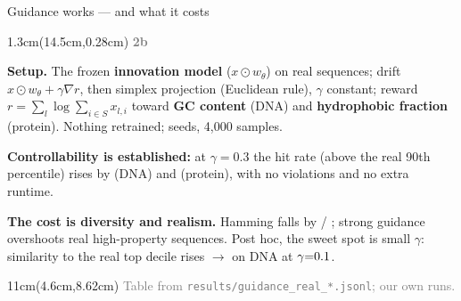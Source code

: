 \documentclass[aspectratio=169,10pt]{beamer}
\newcommand{\lab}[1]{%
  \begin{textblock*}{1.3cm}(14.5cm,0.28cm)
    \raggedleft\bfseries\small\textcolor{gray}{#1}
  \end{textblock*}}
\newcommand{\srcs}[1]{%
  \begin{textblock*}{11cm}(4.6cm,8.62cm)
    \raggedleft\fontsize{4.8}{5.6}\selectfont\textcolor{gray}{#1}
  \end{textblock*}}
\begin{document}
\begin{frame}{Guidance works --- and what it costs}
\lab{2b}
\textbf{Setup.} The frozen \textbf{innovation model} ($x\odot w_\theta$) on real sequences; drift
$x\odot w_\theta+\gamma\nabla r$, then simplex projection (Euclidean rule), $\gamma$ constant; reward
$r=\sum_l\log\sum_{i\in S}x_{l,i}$ toward \textbf{GC content} (DNA) and \textbf{hydrophobic
fraction} (protein). Nothing retrained; \GRSeeds{} seeds, 4{,}000 samples.
\begin{center}\tiny\resizebox{0.62\linewidth}{!}{}\end{center}

\textbf{Controllability is established:} at $\gamma{=}0.3$ the hit rate (above the real 90th
percentile) rises by \GRHitCIDna{} (DNA) and \GRHitCIProt{} (protein), with no violations and no
extra runtime.

\medskip
\textbf{The cost is diversity and realism.} Hamming falls by \GRHamCIDna{} / \GRHamCIProt; strong
guidance overshoots real high-property sequences. Post hoc, the sweet spot is small $\gamma$:
similarity to the real top decile rises \GRKmerHiZeroDna{}$\rightarrow$\GRKmerHiMidDna{} on DNA at
$\gamma{=}0.1$.
\srcs{Table from \texttt{results/guidance\_real\_*.jsonl}; our own runs.}
\end{frame}
\end{document}

